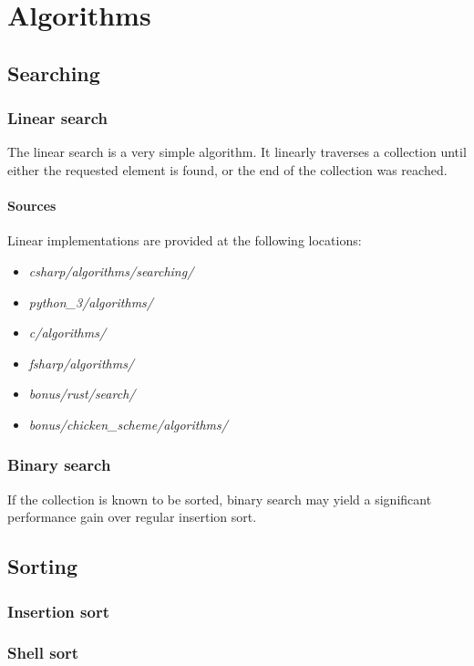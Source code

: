\documentclass{article}
\begin{document}
\newpage


\section{Algorithms}
\subsection{Searching}
\subsubsection{Linear search}
The linear search is a very simple algorithm. It linearly traverses a collection until either the requested
element is found, or the end of the collection was reached.

\paragraph{Sources}
Linear implementations are provided at the following locations:
\begin{itemize}
\item{{\em csharp/algorithms/searching/}}
\item{{\em python\_3/algorithms/}}
\item{{\em c/algorithms/}}
\item{{\em fsharp/algorithms/}}
\item{{\em bonus/rust/search/}}
\item{{\em bonus/chicken\_scheme/algorithms/}}
\end{itemize}

\subsubsection{Binary search}
If the collection is known to be sorted, binary search may yield a significant performance gain over regular insertion sort.

\newpage

\subsection{Sorting}
\subsubsection{Insertion sort}


\subsubsection{Shell sort}
\end{document}
